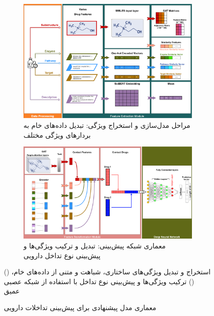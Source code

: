 \begin{figure}[!t]
	\centering
	\begin{subfigure}[b]{\textwidth}
		\centering
		\includegraphics[width=\textwidth]{images/proposed-model-1.png}
		\caption[ ]{مراحل مدل‌سازی و استخراج ویژگی: تبدیل داده‌های خام به بردارهای ویژگی مختلف}
		\label{fig:sub1}
	\end{subfigure}
	\begin{subfigure}[b]{\textwidth}
		\centering
		\includegraphics[width=\textwidth]{images/proposed-model-2.png}
		\caption[ ]{معماری شبکه پیش‌بینی: تبدیل و ترکیب ویژگی‌ها و پیش‌بینی نوع تداخل دارویی}
		\label{fig:sub2}
	\end{subfigure}
	\caption{معماری مدل پیشنهادی برای پیش‌بینی تداخلات دارویی} () استخراج و تبدیل ویژگی‌های ساختاری، شباهت و متنی از داده‌های خام، () ترکیب ویژگی‌ها و پیش‌بینی نوع تداخل با استفاده از شبکه عصبی عمیق
	\label{fig:model_architecture}
\end{figure}

